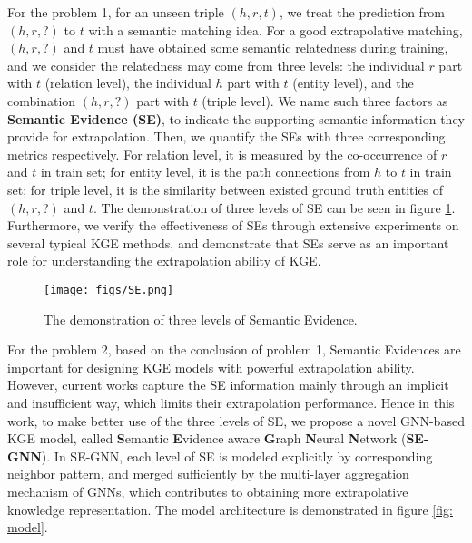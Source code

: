 \documentclass[letterpaper]{article} \usepackage{aaai22}  \usepackage{times}  \usepackage{helvet}  \usepackage{courier}  \usepackage[hyphens]{url}  \usepackage{graphicx} \urlstyle{rm} \def\UrlFont{\rm}  \usepackage{natbib}  \usepackage{caption} \DeclareCaptionStyle{ruled}{labelfont=normalfont,labelsep=colon,strut=off} \frenchspacing  \setlength{\pdfpagewidth}{8.5in}  \setlength{\pdfpageheight}{11in}  \usepackage{algorithm}
\begin{document}
For the problem 1, for an unseen triple $(h, r, t)$, we treat the prediction from $(h, r, ?)$ to $t$ with a semantic matching idea. For a good extrapolative matching, $(h, r, ?)$ and $t$ must have obtained some semantic relatedness during training, and we consider the relatedness may come from three levels: the individual $r$ part with $t$ (relation level), the individual $h$ part with $t$ (entity level), and the combination $(h, r, ?)$ part with $t$ (triple level). 
We name such three factors as \textbf{Semantic Evidence (SE)}, to indicate the supporting semantic information they provide for extrapolation. Then, we quantify the SEs with three corresponding metrics respectively. 
For relation level, it is measured by the co-occurrence of $r$ and $t$ in train set; for entity level, it is the path connections from $h$ to $t$ in train set; for triple level, it is the similarity between existed ground truth entities of $(h, r, ?)$ and $t$. The demonstration of three levels of SE can be seen in figure \ref{fig: SE}. 
Furthermore, we verify the effectiveness of SEs through extensive experiments on several typical KGE methods, and demonstrate that SEs serve as an important role for understanding the extrapolation ability of KGE.

\begin{figure}[t]
    \centering 
    \texttt{[image: figs/SE.png]}
    \caption{The demonstration of three levels of Semantic Evidence.} 
    \label{fig: SE} 
\end{figure}

For the problem 2, based on the conclusion of problem 1, Semantic Evidences are important for designing KGE models with powerful extrapolation ability. However, current works capture the SE information mainly through an implicit and insufficient way, which limits their extrapolation performance. 
Hence in this work, to make better use of the three levels of SE, we propose a novel GNN-based KGE model, called \textbf{S}emantic \textbf{E}vidence aware \textbf{G}raph \textbf{N}eural \textbf{N}etwork (\textbf{SE-GNN}). In SE-GNN, each level of SE is modeled explicitly by corresponding neighbor pattern, and merged sufficiently by the multi-layer aggregation mechanism of GNNs, which contributes to obtaining more extrapolative knowledge representation. The model architecture is demonstrated in figure \ref{fig: model}.
\end{document}
